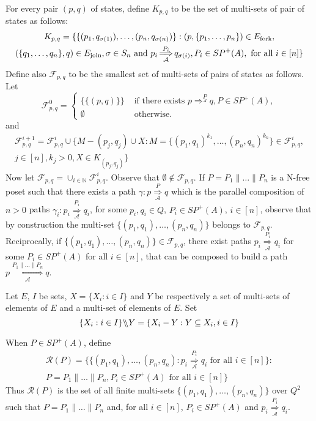 \documentclass{CSML}
\newcommand{\quotientparallel}[2]{\ensuremath{#1\backslash\kern-3pt\backslash#2}}
\begin{document}
For every pair $(p,q)$ of states, define $K_{p,q}$ to be the set of multi-sets of pair of states as follows:
\begin{multline*}
K_{p,q}=\{\{(p_1,q_{\sigma(1)}),\dots,(p_n,q_{\sigma(n)})\} : (p,\{p_1,\dots,p_n\})\in E_\text{fork},\\ (\{q_1,\dots,q_n\},q)\in E_\text{join}, \sigma\in S_n\text{ and } p_i \mathop{\Longrightarrow}^{P_i}\limits_{\mathcal{A}} q_{\sigma(i)}, P_i\in SP^+(A), \text{ for all }i\in[n]\}
$$
\end{multline*}
Define also $\mathcal{F}_{p,q}$ to be the smallest set of multi-sets of pairs of states as follows.
Let
$$\mathcal{F}^0_{p,q}=
\begin{cases}
\{\{(p,q)\}\} &\text{ if there exists } p \mathop{\Longrightarrow}^P\limits_{\mathcal{A}} q, P\in SP^+(A),\\
\emptyset &\text{ otherwise.}
\end{cases}
$$
and 
\begin{multline*}
\mathcal{F}_{p,q}^{i+1}=\mathcal{F}_{p,q}^{i}\cup\{ M-(p_j,q_j)\cup X :
M = \{(p_1,q_1)^{k_1},\dots,(p_n,q_n)^{k_n}\}\in \mathcal{F}_{p,q}^{i},\\
j\in[n], k_j>0, X\in K_{(p_j,q_j)} \}
\end{multline*}
Now let $\mathcal{F}_{p,q}=\cup_{i\in\mathbb{N}}\mathcal{F}^{i}_{p,q}$.
Observe that $\emptyset\not\in\mathcal{F}_{p,q}$.
If $P=P_1\parallel\dots\parallel P_n$ is a N-free poset such that there exists a path $\gamma:p\mathop{\Longrightarrow}\limits_{\mathcal{A}}^{P} q$ which is the parallel composition of $n>0$ paths $\gamma_i:p_i\mathop{\Longrightarrow}\limits_{\mathcal{A}}^{P_i} q_i$, for some $p_i,q_i\in Q$, $P_i\in SP^+(A)$, $i\in[n]$, observe that by construction the multi-set $\{(p_1,q_1),\dots,(p_n,q_n)\}$ belongs to $\mathcal{F}_{p,q}$. Reciprocally, if $\{(p_1,q_1),\dots,(p_n,q_n)\}\in \mathcal{F}_{p,q}$, there exist paths $p_i\mathop{\Longrightarrow}\limits_{\mathcal{A}}^{P_i} q_i$ for some $P_i\in SP^+(A)$ for all $i\in[n]$, that can be composed to build a path $p\mathop{\Longrightarrow}\limits_{\mathcal{A}}^{P_1\parallel\dots\parallel P_n} q$.

Let $E$, $I$ be sets, $X=\{ X_i :i\in I\}$ and $Y$ be respectively a set of multi-sets of elements of $E$ and a multi-set of elements of $E$. Set
$$\quotientparallel{\{X_i:i\in I\}}{Y}=\{X_i-Y : Y\subseteq X_i, i\in I\}$$

When $P\in SP^+(A)$, define
\begin{multline*}
\mathcal{R}(P)=\{\{ (p_1,q_1),\dots,(p_n,q_n) : p_i \mathop{\Longrightarrow}\limits_{\mathcal{A}}^{P_i} q_i \text{ for all }i\in[n]\} : \\ P=P_1\parallel\dots\parallel P_n, P_i\in SP^+(A)\text{ for all }i\in[n]\}
\end{multline*}
Thus $\mathcal{R}(P)$ is the set of all finite multi-sets $\{(p_1,q_1),\dots,(p_n,q_n)\}$ over $Q^2$ such that $P=P_1\parallel\dots\parallel P_n$ and, for all $i\in[n]$, $P_i\in SP^+(A)$ and $p_i \mathop{\Longrightarrow}\limits_{\mathcal{A}}^{P_i} q_i$.
\end{document}
